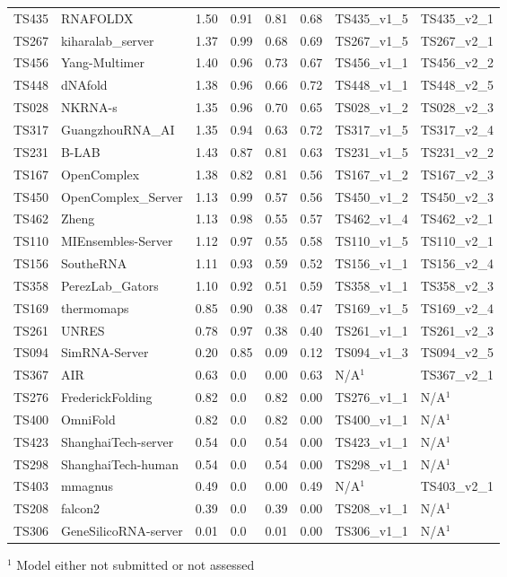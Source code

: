 \begin{table}[ht]
{\begin{tabular}{llllllll}
TS435 & RNAFOLDX & 1.50 & 0.91 & 0.81 & 0.68 & TS435\_v1\_5 & TS435\_v2\_1 \\ 
TS267 & kiharalab\_server & 1.37 & 0.99 & 0.68 & 0.69 & TS267\_v1\_5 & TS267\_v2\_1 \\ 
TS456 & Yang-Multimer & 1.40 & 0.96 & 0.73 & 0.67 & TS456\_v1\_1 & TS456\_v2\_2 \\ 
TS448 & dNAfold & 1.38 & 0.96 & 0.66 & 0.72 & TS448\_v1\_1 & TS448\_v2\_5 \\ 
TS028 & NKRNA-s & 1.35 & 0.96 & 0.70 & 0.65 & TS028\_v1\_2 & TS028\_v2\_3 \\ 
TS317 & GuangzhouRNA\_AI & 1.35 & 0.94 & 0.63 & 0.72 & TS317\_v1\_5 & TS317\_v2\_4 \\ 
TS231 & B-LAB & 1.43 & 0.87 & 0.81 & 0.63 & TS231\_v1\_5 & TS231\_v2\_2 \\ 
TS167 & OpenComplex & 1.38 & 0.82 & 0.81 & 0.56 & TS167\_v1\_2 & TS167\_v2\_3 \\ 
TS450 & OpenComplex\_Server & 1.13 & 0.99 & 0.57 & 0.56 & TS450\_v1\_2 & TS450\_v2\_3 \\ 
TS462 & Zheng & 1.13 & 0.98 & 0.55 & 0.57 & TS462\_v1\_4 & TS462\_v2\_1 \\ 
TS110 & MIEnsembles-Server & 1.12 & 0.97 & 0.55 & 0.58 & TS110\_v1\_5 & TS110\_v2\_1 \\ 
TS156 & SoutheRNA & 1.11 & 0.93 & 0.59 & 0.52 & TS156\_v1\_1 & TS156\_v2\_4 \\ 
TS358 & PerezLab\_Gators & 1.10 & 0.92 & 0.51 & 0.59 & TS358\_v1\_1 & TS358\_v2\_3 \\ 
TS169 & thermomaps & 0.85 & 0.90 & 0.38 & 0.47 & TS169\_v1\_5 & TS169\_v2\_4 \\ 
TS261 & UNRES & 0.78 & 0.97 & 0.38 & 0.40 & TS261\_v1\_1 & TS261\_v2\_3 \\ 
TS094 & SimRNA-Server & 0.20 & 0.85 & 0.09 & 0.12 & TS094\_v1\_3 & TS094\_v2\_5 \\ 
TS367 & AIR & 0.63 & 0.0 & 0.00 & 0.63 & N/A$^{1}$ & TS367\_v2\_1 \\ 
TS276 & FrederickFolding & 0.82 & 0.0 & 0.82 & 0.00 & TS276\_v1\_1 & N/A$^{1}$ \\ 
TS400 & OmniFold & 0.82 & 0.0 & 0.82 & 0.00 & TS400\_v1\_1 & N/A$^{1}$ \\ 
TS423 & ShanghaiTech-server & 0.54 & 0.0 & 0.54 & 0.00 & TS423\_v1\_1 & N/A$^{1}$ \\ 
TS298 & ShanghaiTech-human & 0.54 & 0.0 & 0.54 & 0.00 & TS298\_v1\_1 & N/A$^{1}$ \\ 
TS403 & mmagnus & 0.49 & 0.0 & 0.00 & 0.49 & N/A$^{1}$ & TS403\_v2\_1 \\ 
TS208 & falcon2 & 0.39 & 0.0 & 0.39 & 0.00 & TS208\_v1\_1 & N/A$^{1}$ \\ 
TS306 & GeneSilicoRNA-server & 0.01 & 0.0 & 0.01 & 0.00 & TS306\_v1\_1 & N/A$^{1}$ \\ 
\bottomrule
\end{tabular}%
}
\begin{flushleft}\footnotesize $^{1}$ Model either not submitted or not assessed\end{flushleft}
\end{table}
